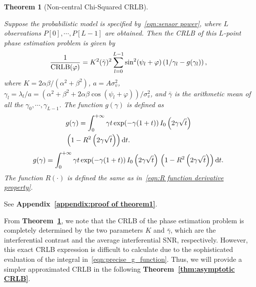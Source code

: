 \documentclass[journal,twocolumn]{IEEEtran}
\newtheorem{theorem}{\bf Theorem}
\theoremstyle{nonumberplain}
\begin{document}
    \begin{theorem}[Non-central Chi-Squared CRLB] \label{thm:precise CRLB}\mbox{}\par
        Suppose the probabilistic model is specified by~\eqref{eqn:sensor power}, where $L$ observations $P[0],\cdots,P[L-1]$ are obtained. Then the CRLB of this $L$-point phase estimation problem is given by
        \begin{equation}
            \frac{1}{{\rm CRLB}(\varphi)} = K^2(\bar{\gamma})^2 \sum_{l=0}^{L-1}\sin^2(\psi_l+\varphi)\left(1/\gamma_l-g(\gamma_l)\right),
            \label{eqn:precise_CRLB}
        \end{equation}
        where $K=2\alpha\beta/(\alpha^2+\beta^2)$, $a=A\sigma_v^2$, $\gamma_l=\lambda_l/a=\left(\alpha^2+\beta^2+2\alpha\beta \cos(\psi_l+\varphi)\right)/\sigma_v^2$, and $\bar{\gamma}$ is the arithmetic mean of all the $\gamma_0,\cdots,\gamma_{L-1}$. The function $g(\gamma)$ is defined as 
        \ifx\onecol\undefined
            \begin{equation}\label{eqn:precise_g_function}
                \begin{aligned}
                    & g(\gamma)  = \int_{0}^{+\infty}\gamma t \, {\rm exp}(-\gamma(1+t))\, I_0\left(2\gamma\sqrt{t}\right) \\
                    & \left(1-R^2\left(2\gamma\sqrt{t}\right)\right){\rm d}t.
                \end{aligned}
            \end{equation}
        \else 
            \begin{equation}
                g(\gamma)  = \int_{0}^{+\infty}\gamma t \, {\rm exp}(-\gamma(1+t))\, I_0\left(2\gamma\sqrt{t}\right)\,\left(1-R^2\left(2\gamma\sqrt{t}\right)\right){\rm d}t.
                \label{eqn:precise_g_function}
            \end{equation}
        \fi
        The function $R(\cdot)$ is defined the same as in~\eqref{eqn:R function derivative property}.
    \end{theorem}
    \begin{IEEEproof}
        See {\bf Appendix~\ref{appendix:proof of theorem1}}. 
    \end{IEEEproof}

    From \textbf{Theorem~\ref{thm:precise CRLB}}, we note that the CRLB of the phase estimation problem is completely determined by the two parameters $K$ and $\bar{\gamma}$, which are the interferential contrast and the average interferential SNR, respectively. 
    However, this exact CRLB expression is difficult to calculate due to the sophisticated evaluation of the integral in~\eqref{eqn:precise_g_function}.
    Thus, we will provide a simpler approximated CRLB in the following {\bf Theorem~\ref{thm:asymptotic CRLB}}. 
    
\end{document}
